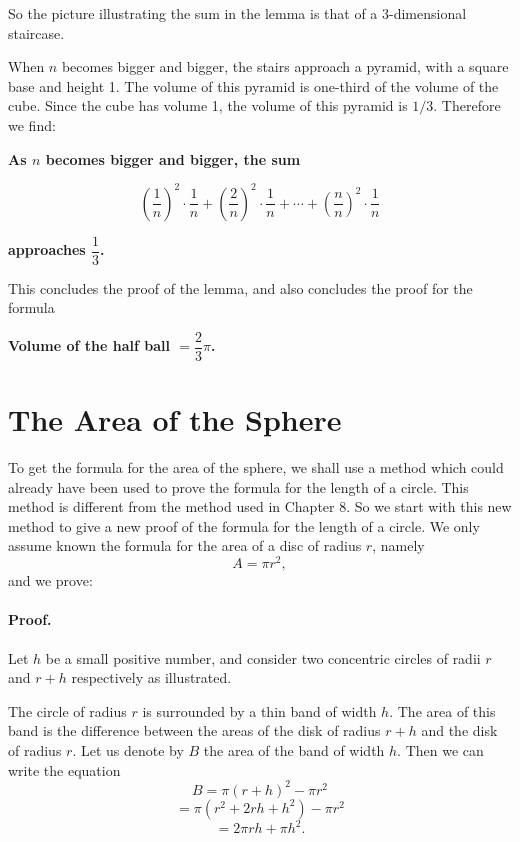 \documentclass[12pt]{book} %
\begin{document}
So the picture illustrating the sum in the lemma is that of a 3-dimensional staircase.

When $n$ becomes bigger and bigger, the stairs approach a pyramid, with a square base and height 1. The volume of this pyramid is one-third of the volume of the cube. Since the cube has volume 1, the volume of this pyramid is $1/3$. Therefore we find:

\begin{center}
\textbf{As $n$ becomes bigger and bigger, the sum}
\end{center}
\[
\left(\frac1n\right)^2\cdot\frac1n
+\left(\frac2n\right)^2\cdot\frac1n
+\cdots
+\left(\frac{n}{n}\right)^2\cdot\frac1n
\]
\begin{center}
\textbf{approaches $\dfrac13$.}
\end{center}

This concludes the proof of the lemma, and also concludes the proof for the formula

\begin{center}
\textbf{Volume of the half ball $=\dfrac23\pi$.}
\end{center}

\section{The Area of the Sphere}

To get the formula for the area of the sphere, we shall use a method which could already have been used to prove the formula for the length of a circle. This method is different from the method used in Chapter 8. So we start with this new method to give a new proof of the formula for the length of a circle. We only assume known the formula for the area of a disc of radius $r$, namely
\[
A=\pi r^2,
\]
and we prove:


\paragraph{Proof.}
Let $h$ be a small positive number, and consider two concentric circles of radii $r$ and $r+h$ respectively as illustrated.


The circle of radius $r$ is surrounded by a thin band of width $h$. The area of this band is the difference between the areas of the disk of radius $r+h$ and the disk of radius $r$. Let us denote by $B$ the area of the band of width $h$. Then we can write the equation
\[
B=\pi(r+h)^2-\pi r^2
\]
\[
=\pi(r^2+2rh+h^2)-\pi r^2
\]
\[
=2\pi rh+\pi h^2.
\]
\end{document}
